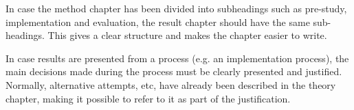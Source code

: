 In case the method chapter has been divided into subheadings such as
pre-study, implementation and evaluation, the result chapter should
have the same sub-headings. This gives a clear structure and makes the
chapter easier to write.

In case results are presented from a process (e.g. an implementation
process), the main decisions made during the process must be clearly
presented and justified. Normally, alternative attempts, etc, have
already been described in the theory chapter, making it possible to
refer to it as part of the justification.

